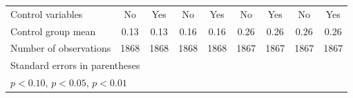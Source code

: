 {\begin{tabular}{l*{8}{c}}
Control variables   &          No         &         Yes         &          No         &         Yes         &          No         &         Yes         &          No         &         Yes         \\
Control group mean  &        0.13         &        0.13         &        0.16         &        0.16         &        0.26         &        0.26         &        0.26         &        0.26         \\
Number of observations&        1868         &        1868         &        1868         &        1868         &        1867         &        1867         &        1867         &        1867         \\
\hline\hline
\multicolumn{9}{l}{\footnotesize Standard errors in parentheses}\\
\multicolumn{9}{l}{\footnotesize \sym{*} \(p<0.10\), \sym{**} \(p<0.05\), \sym{***} \(p<0.01\)}\\
\end{tabular}
}
